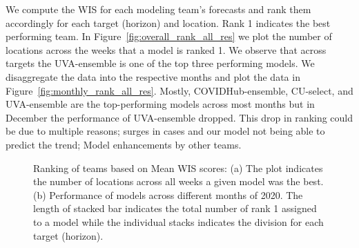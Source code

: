 \documentclass[sigconf]{acmart}
\begin{document}
We compute the WIS for each modeling team's forecasts and rank them accordingly for each target (horizon) and location. Rank 1 indicates the best performing team. In Figure~\ref{fig:overall_rank_all_res} we plot the number of locations across the weeks that a model is ranked 1. We observe that across targets the UVA-ensemble is one of the top three performing models. We disaggregate the data into the respective months and plot the data in Figure~\ref{fig:monthly_rank_all_res}. Mostly, COVIDHub-ensemble, CU-select, and UVA-ensemble are the top-performing models across most months but in December the performance of UVA-ensemble dropped. This drop in ranking could be due to multiple reasons; surges in cases and our model not being able to predict the trend; Model enhancements by other teams.

\begin{figure}
    \centering
    \caption{Ranking of teams based on Mean WIS scores: (a) The plot indicates the number of locations across all weeks a given model was the best. (b) Performance of models across different months of 2020. The length of stacked bar indicates the total number of rank 1 assigned to a model while the individual stacks indicates the division for each target (horizon).}
    \label{fig:rank_all_res}
\end{figure}
\end{document}
